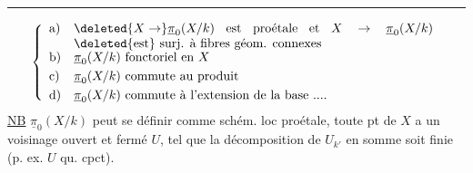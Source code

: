 \par\noindent\rule{.20\linewidth}{.4pt}\par
\[
\left\{\begin{array}{ll}
\text{a)} & \parbox[t]{.82\linewidth}{$\deleted{X\to}\underline{\pi}_0(X/k)$ est proétale et $X\to\underline{\pi}_0(X/k)$ \deleted{est} surj. à fibres géom. connexes}\\[.7ex]
\text{b)} & \underline{\pi}_0(X/k)\ \text{fonctoriel en }X\\[.7ex]
\text{c)} & \underline{\pi}_0(X/k)\ \text{commute au produit}\\[.7ex]
\text{d)} & \underline{\pi}_0(X/k)\ \text{commute à l'extension de la base ....}
\end{array}\right.
\]
\uline{NB} $\underline{\pi}_0(X/k)$ peut se définir comme schém. loc proétale,  toute pt de  $X$ a un voisinage ouvert et fermé $U$, tel que  la décomposition de $U_{k'}$ en somme   soit finie (p. ex. $U$ qu. cpct).

